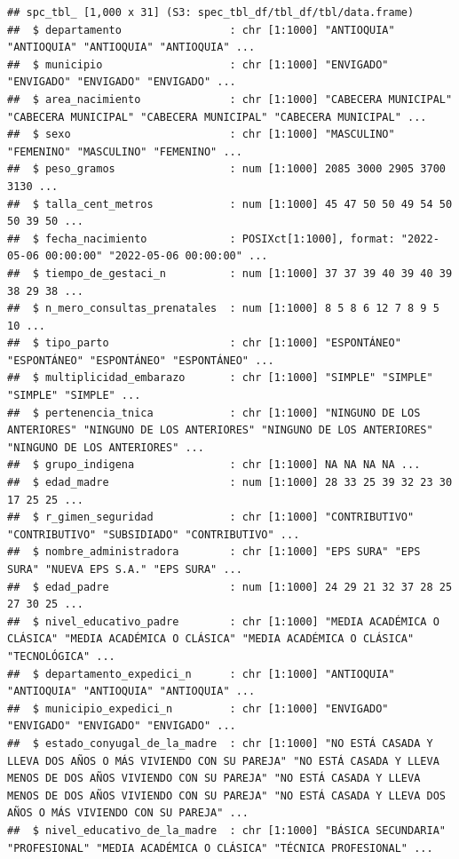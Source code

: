 \documentclass[
]{book}
\begin{document}
\begin{verbatim}
## spc_tbl_ [1,000 x 31] (S3: spec_tbl_df/tbl_df/tbl/data.frame)
##  $ departamento                 : chr [1:1000] "ANTIOQUIA" "ANTIOQUIA" "ANTIOQUIA" "ANTIOQUIA" ...
##  $ municipio                    : chr [1:1000] "ENVIGADO" "ENVIGADO" "ENVIGADO" "ENVIGADO" ...
##  $ area_nacimiento              : chr [1:1000] "CABECERA MUNICIPAL" "CABECERA MUNICIPAL" "CABECERA MUNICIPAL" "CABECERA MUNICIPAL" ...
##  $ sexo                         : chr [1:1000] "MASCULINO" "FEMENINO" "MASCULINO" "FEMENINO" ...
##  $ peso_gramos                  : num [1:1000] 2085 3000 2905 3700 3130 ...
##  $ talla_cent_metros            : num [1:1000] 45 47 50 50 49 54 50 50 39 50 ...
##  $ fecha_nacimiento             : POSIXct[1:1000], format: "2022-05-06 00:00:00" "2022-05-06 00:00:00" ...
##  $ tiempo_de_gestaci_n          : num [1:1000] 37 37 39 40 39 40 39 38 29 38 ...
##  $ n_mero_consultas_prenatales  : num [1:1000] 8 5 8 6 12 7 8 9 5 10 ...
##  $ tipo_parto                   : chr [1:1000] "ESPONTÁNEO" "ESPONTÁNEO" "ESPONTÁNEO" "ESPONTÁNEO" ...
##  $ multiplicidad_embarazo       : chr [1:1000] "SIMPLE" "SIMPLE" "SIMPLE" "SIMPLE" ...
##  $ pertenencia_tnica            : chr [1:1000] "NINGUNO DE LOS ANTERIORES" "NINGUNO DE LOS ANTERIORES" "NINGUNO DE LOS ANTERIORES" "NINGUNO DE LOS ANTERIORES" ...
##  $ grupo_indigena               : chr [1:1000] NA NA NA NA ...
##  $ edad_madre                   : num [1:1000] 28 33 25 39 32 23 30 17 25 25 ...
##  $ r_gimen_seguridad            : chr [1:1000] "CONTRIBUTIVO" "CONTRIBUTIVO" "SUBSIDIADO" "CONTRIBUTIVO" ...
##  $ nombre_administradora        : chr [1:1000] "EPS SURA" "EPS SURA" "NUEVA EPS S.A." "EPS SURA" ...
##  $ edad_padre                   : num [1:1000] 24 29 21 32 37 28 25 27 30 25 ...
##  $ nivel_educativo_padre        : chr [1:1000] "MEDIA ACADÉMICA O CLÁSICA" "MEDIA ACADÉMICA O CLÁSICA" "MEDIA ACADÉMICA O CLÁSICA" "TECNOLÓGICA" ...
##  $ departamento_expedici_n      : chr [1:1000] "ANTIOQUIA" "ANTIOQUIA" "ANTIOQUIA" "ANTIOQUIA" ...
##  $ municipio_expedici_n         : chr [1:1000] "ENVIGADO" "ENVIGADO" "ENVIGADO" "ENVIGADO" ...
##  $ estado_conyugal_de_la_madre  : chr [1:1000] "NO ESTÁ CASADA Y LLEVA DOS AÑOS O MÁS VIVIENDO CON SU PAREJA" "NO ESTÁ CASADA Y LLEVA MENOS DE DOS AÑOS VIVIENDO CON SU PAREJA" "NO ESTÁ CASADA Y LLEVA MENOS DE DOS AÑOS VIVIENDO CON SU PAREJA" "NO ESTÁ CASADA Y LLEVA DOS AÑOS O MÁS VIVIENDO CON SU PAREJA" ...
##  $ nivel_educativo_de_la_madre  : chr [1:1000] "BÁSICA SECUNDARIA" "PROFESIONAL" "MEDIA ACADÉMICA O CLÁSICA" "TÉCNICA PROFESIONAL" ...

\end{verbatim}
\end{document}
